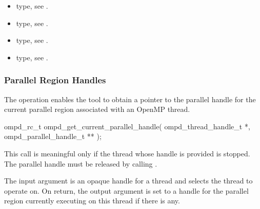 

\crossreferences
\begin{itemize}
	\item {} type, see .
	\item {} type, see .
	\item {} type, see .
	\item {} type, see .
\end{itemize}

\subsubsection{Parallel Region Handles}

\label{subsubsubsec:ompd_get_current_parallel_handle}
\summary
The   operation enables the tool to obtain a pointer to
the parallel handle for the current parallel region associated with an OpenMP thread.

\format

\begin{cspecific}
\begin{ompSyntax}
ompd_rc_t ompd_get_current_parallel_handle(
  ompd_thread_handle_t *,
  ompd_parallel_handle_t **
);
\end{ompSyntax}
\end{cspecific}


\descr
This call is meaningful only if the thread whose handle is provided is stopped. The parallel handle
must be released by calling .

\argdesc
The input argument  is an opaque handle for a thread and selects the thread to operate on.
On return, the output argument  is set to a handle for the parallel region
currently executing on this thread if there is any.


